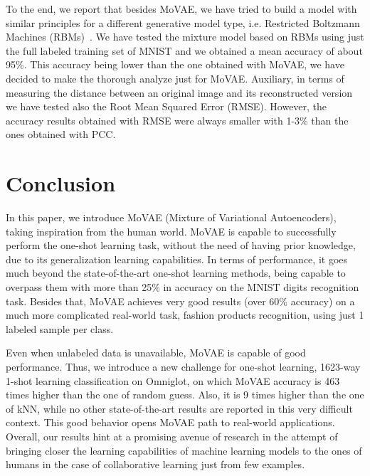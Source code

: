 \documentclass[sigconf,authorversion=true]{aamas}  %
\begin{document}
To the end, we report that besides MoVAE, we have tried to build a model with similar principles for a different generative model type, i.e. Restricted Boltzmann Machines (RBMs)~\cite{originalrbm}. We have tested the mixture model based on RBMs using just the full labeled training set of MNIST and we obtained a mean accuracy of about 95\%. This accuracy being lower than the one obtained with MoVAE, we have decided to make the thorough analyze just for MoVAE. Auxiliary, in terms of measuring the distance between an original image and its reconstructed version we have tested also the Root Mean Squared Error (RMSE). However, the accuracy results obtained with RMSE were always smaller with 1-3\% than the ones obtained with PCC.

\section{Conclusion}

In this paper, we introduce MoVAE (Mixture of Variational Autoencoders), taking inspiration from the human world. MoVAE is capable to successfully perform the one-shot learning task, without the need of having prior knowledge, due to its generalization learning capabilities. In terms of performance, it goes much beyond the state-of-the-art one-shot learning methods, being capable to overpass them with more than 25\% in accuracy on the MNIST digits recognition task. Besides that, MoVAE achieves very good results (over 60\% accuracy) on a much more complicated real-world task, fashion products recognition, using just 1 labeled sample per class.

Even when unlabeled data is unavailable, MoVAE is capable of good performance. Thus, we introduce a new challenge for one-shot learning, 1623-way 1-shot learning classification on Omniglot, on which MoVAE accuracy is 463 times higher than the one of random guess. Also, it is 9 times higher than the one of kNN, while no other state-of-the-art results are reported in this very difficult context. This good behavior opens MoVAE path to real-world applications. Overall, our results hint at a promising avenue of research in the attempt of bringing closer the learning capabilities of machine learning models to the ones of humans in the case of collaborative learning just from few examples.
\end{document}
